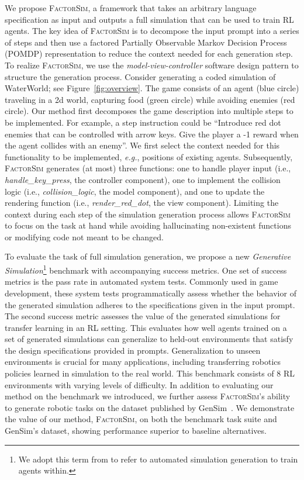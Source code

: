 \documentclass{article}
\theoremstyle{plain}
\theoremstyle{definition}
\theoremstyle{remark}
\newcommand{\method}{\textsc{FactorSim}\xspace}
\begin{document}
We propose \method, a framework that takes an arbitrary language specification as input and outputs a full simulation that can be used to train RL agents. The key idea of \method is to decompose the input prompt into a series of steps and then use a factored Partially Observable Markov Decision Process (POMDP) representation to reduce the context needed for each generation step. To realize \method, we use the \textit{model-view-controller} software design pattern to structure the generation process. 
Consider generating a coded simulation of WaterWorld; see Figure~\ref{fig:overview}. The game consists of an agent (blue circle) traveling in a 2d world, capturing food (green circle) while avoiding enemies (red circle). 
Our method first decomposes the game description into multiple steps to be implemented. For example, a step instruction could be ``Introduce red dot enemies that can be controlled with arrow keys. Give the player a -1 reward when the agent collides with an enemy''. 
We first select the context needed for this functionality to be implemented, \textit{e.g.}, positions of existing agents. 
Subsequently, \method generates (at most) three functions: one to handle player input (i.e., \textit{handle\_key\_press}, the controller component), one to implement the collision logic (i.e., \textit{collision\_logic}, the model component), and one to update the rendering function (i.e., \textit{render\_red\_dot}, the view component). 
Limiting the context during each step of the simulation generation process allows \method to focus on the task at hand while avoiding hallucinating non-existent functions or modifying code not meant to be changed.



To evaluate the task of full simulation generation, we propose a new \textit{Generative Simulation}\footnote{We adopt this term from \cite{xian2023towards} to refer to automated simulation generation to train agents within.} benchmark with accompanying success metrics.
One set of success metrics is the pass rate in automated system tests. Commonly used in game development, these system tests programmatically assess whether the behavior of the generated simulation adheres to the specifications given in the input prompt. 
The second success metric assesses the value of the generated simulations for transfer learning in an RL setting. 
This evaluates how well agents trained on a set of generated simulations can generalize to held-out environments that satisfy the design specifications provided in prompts.
Generalization to unseen environments is crucial for many applications, including transferring robotics policies learned in simulation to the real world.
This benchmark consists of 8 RL environments with varying levels of difficulty. In addition to evaluating our method on the benchmark we introduced, we further assess \method's ability to generate robotic tasks on the dataset published by GenSim~\cite{wang2023gensim}. We demonstrate the value of our method, \method, on both the benchmark task suite and GenSim's dataset, showing performance superior to baseline alternatives.
\end{document}
